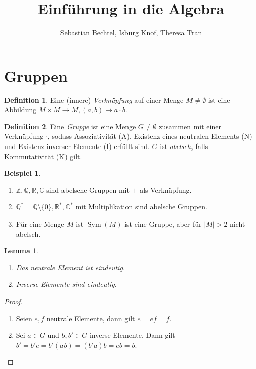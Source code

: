 \documentclass[12pt]{scrartcl} %
\DeclareMathOperator{\sym}{Sym}
\newtheorem{lemma}{Lemma}
\theoremstyle{definition}
\newtheorem*{defn}{Definition}
\newtheorem{ex}{Beispiel}
\theoremstyle{remark}
\begin{document}
\author{Sebastian Bechtel, Isburg Knof, Theresa Tran} %
\title{Einführung in die Algebra}

\maketitle

\section{Gruppen}

\begin{defn}
	Eine (innere) \emph{Verknüpfung} auf einer Menge $M\neq \emptyset$ ist eine Abbildung $M\times M\to M, (a,b)\mapsto a\cdot b$.
\end{defn}

\begin{defn}
	Eine \emph{Gruppe} ist eine Menge $G\neq \emptyset$ zusammen mit einer Verknüpfung $\cdot$, sodass Assoziativität (A), Existenz eines neutralen Elements (N) und Existenz inverser Elemente (I) erfüllt sind.
	$G$ ist \emph{abelsch}, falls Kommutativität (K) gilt.
\end{defn}

\begin{ex}
	\begin{enumerate}
	\item $\mathbb{Z}, \mathbb{Q}, \mathbb{R}, \mathbb{C}$ sind abelsche Gruppen mit $+$ als Verknüpfung.
	\item $\mathbb{Q}^*=\mathbb{Q}\setminus \{0\}, \mathbb{R}^*, \mathbb{C}^*$ mit Multiplikation sind abelsche Gruppen.
	\item Für eine Menge $M$ ist $\sym(M)$ ist eine Gruppe, aber für $|M| > 2$ nicht abelsch.
	\end{enumerate}
\end{ex}

\begin{lemma}
	\begin{enumerate}[label=\alph*)]
	\item Das neutrale Element ist eindeutig.
	\item Inverse Elemente sind eindeutig.
	\end{enumerate}
\end{lemma}

\begin{proof}
	\begin{enumerate}[label=\alph*)]
	\item Seien $e,f$ neutrale Elemente, dann gilt $e=ef=f$.
	\item Sei $a\in G$ und $b,b'\in G$ inverse Elemente. Dann gilt $b'=b'e=b'(ab)=(b'a)b=eb=b$.
	\end{enumerate}
\end{proof}
\end{document}
